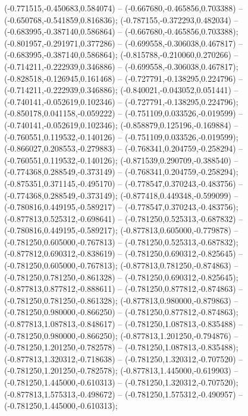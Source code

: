  (-0.771515,-0.450683,0.584074) -- (-0.667680,-0.465856,0.703388) -- (-0.650768,-0.541859,0.816836);
 (-0.787155,-0.372293,0.482034) -- (-0.683995,-0.387140,0.586864) -- (-0.667680,-0.465856,0.703388);
 (-0.801957,-0.291971,0.377286) -- (-0.699558,-0.306038,0.467817) -- (-0.683995,-0.387140,0.586864);
 (-0.815788,-0.210060,0.270266) -- (-0.714211,-0.222939,0.346886) -- (-0.699558,-0.306038,0.467817);
 (-0.828518,-0.126945,0.161468) -- (-0.727791,-0.138295,0.224796) -- (-0.714211,-0.222939,0.346886);
 (-0.840021,-0.043052,0.051441) -- (-0.740141,-0.052619,0.102346) -- (-0.727791,-0.138295,0.224796);
 (-0.850178,0.041158,-0.059222) -- (-0.751109,0.033526,-0.019599) -- (-0.740141,-0.052619,0.102346);
 (-0.858879,0.125196,-0.169884) -- (-0.760551,0.119532,-0.140126) -- (-0.751109,0.033526,-0.019599);
 (-0.866027,0.208553,-0.279883) -- (-0.768341,0.204759,-0.258294) -- (-0.760551,0.119532,-0.140126);
 (-0.871539,0.290709,-0.388540) -- (-0.774368,0.288549,-0.373149) -- (-0.768341,0.204759,-0.258294);
 (-0.875351,0.371145,-0.495170) -- (-0.778547,0.370243,-0.483756) -- (-0.774368,0.288549,-0.373149);
 (-0.877418,0.449348,-0.599099) -- (-0.780816,0.449195,-0.589217) -- (-0.778547,0.370243,-0.483756);
 (-0.877813,0.525312,-0.698641) -- (-0.781250,0.525313,-0.687832) -- (-0.780816,0.449195,-0.589217);
 (-0.877813,0.605000,-0.779878) -- (-0.781250,0.605000,-0.767813) -- (-0.781250,0.525313,-0.687832);
 (-0.877812,0.690312,-0.838619) -- (-0.781250,0.690312,-0.825645) -- (-0.781250,0.605000,-0.767813);
 (-0.877813,0.781250,-0.874863) -- (-0.781250,0.781250,-0.861328) -- (-0.781250,0.690312,-0.825645);
 (-0.877813,0.877812,-0.888611) -- (-0.781250,0.877812,-0.874863) -- (-0.781250,0.781250,-0.861328);
 (-0.877813,0.980000,-0.879863) -- (-0.781250,0.980000,-0.866250) -- (-0.781250,0.877812,-0.874863);
 (-0.877813,1.087813,-0.848617) -- (-0.781250,1.087813,-0.835488) -- (-0.781250,0.980000,-0.866250);
 (-0.877813,1.201250,-0.794876) -- (-0.781250,1.201250,-0.782578) -- (-0.781250,1.087813,-0.835488);
 (-0.877813,1.320312,-0.718638) -- (-0.781250,1.320312,-0.707520) -- (-0.781250,1.201250,-0.782578);
 (-0.877813,1.445000,-0.619903) -- (-0.781250,1.445000,-0.610313) -- (-0.781250,1.320312,-0.707520);
 (-0.877813,1.575313,-0.498672) -- (-0.781250,1.575312,-0.490957) -- (-0.781250,1.445000,-0.610313);
